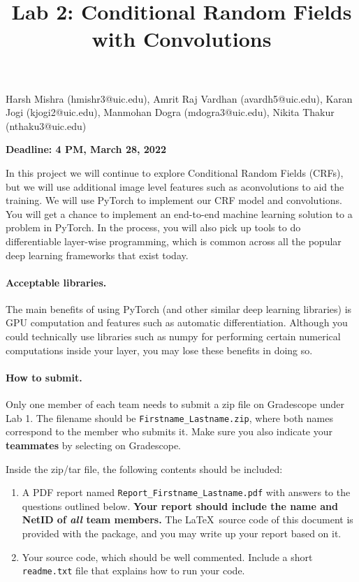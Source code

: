 \documentclass[11pt]{report}
\title{Lab 2: Conditional Random Fields with Convolutions}
\begin{document}
\maketitle
Harsh Mishra (hmishr3@uic.edu), Amrit Raj Vardhan (avardh5@uic.edu), Karan Jogi (kjogi2@uic.edu), Manmohan Dogra (mdogra3@uic.edu), Nikita Thakur (nthaku3@uic.edu)

{\bf Deadline: 4 PM, March 28, 2022}

In this project we will continue to explore Conditional Random Fields (CRFs),
but we will use additional image level features such as aconvolutions to aid the
training. We will use PyTorch to implement our CRF model and convolutions. You
will get a chance to implement an end-to-end machine learning solution to a
problem in PyTorch. In the process, you will also pick up tools to do
differentiable layer-wise programming, which is common across all the popular
deep learning frameworks that exist today.

\paragraph{Acceptable libraries.}
The main benefits of using PyTorch (and other similar deep learning libraries) is GPU computation and features such as automatic differentiation. Although you could technically use libraries such as numpy for performing certain numerical computations inside your layer, you may lose these benefits in doing so. 

\paragraph{How to submit.}

Only one member of each team needs to submit a zip file on Gradescope under Lab 1.
The filename should be \verb#Firstname_Lastname.zip#,
where both names correspond to the member who submits it.
Make sure you also indicate your \textbf{teammates} by selecting on Gradescope.

Inside the zip/tar file, the following contents should be included:
\vspace{-1em}
\begin{enumerate}

  \item  A PDF report named \verb#Report_Firstname_Lastname.pdf# with answers to the questions outlined below.
    {\bf Your report should include the name and NetID of \emph{all} team members.}
    The \LaTeX\ source code of this document is provided with the package, and
    you may write up your report based on it.
  \item Your source code, which should be well commented.
    Include a short \verb#readme.txt# file that explains how to run your code.
\end{enumerate}
\vspace{-1em}
\end{document}
